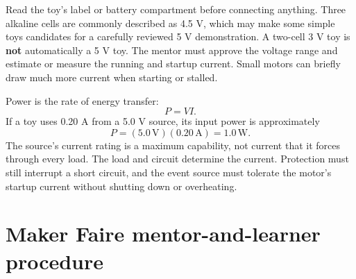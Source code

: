 Read the toy's label or battery compartment before connecting anything. Three alkaline cells are commonly described as 4.5 V, which may make some simple toys candidates for a carefully reviewed 5 V demonstration. A two-cell 3 V toy is \textbf{not} automatically a 5 V toy. The mentor must approve the voltage range and estimate or measure the running and startup current. Small motors can briefly draw much more current when starting or stalled.

Power is the rate of energy transfer:
\[
P = V I.
\]
If a toy uses 0.20 A from a 5.0 V source, its input power is approximately
\[
P = (5.0\,\mathrm{V})(0.20\,\mathrm{A}) = 1.0\,\mathrm{W}.
\]
The source's current rating is a maximum capability, not current that it forces through every load. The load and circuit determine the current. Protection must still interrupt a short circuit, and the event source must tolerate the motor's startup current without shutting down or overheating.

\clearpage
\section*{Maker Faire mentor-and-learner procedure}

